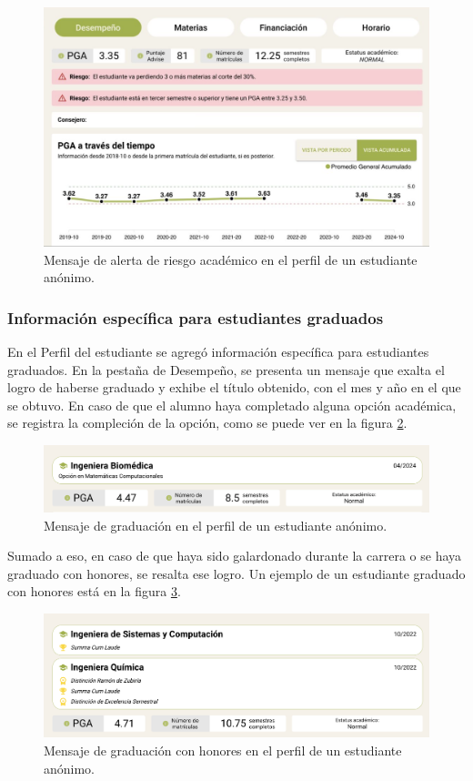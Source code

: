 \begin{figure}[H]
	\includegraphics[width=\textwidth]{assets/nes/riesgo_academico.png}
	\caption{Mensaje de alerta de riesgo académico en el perfil de un estudiante anónimo.}
	\label{fig:riesgo_academico}
\end{figure}

\subsubsection{Información específica para estudiantes graduados}

En el Perfil del estudiante se agregó información específica para estudiantes graduados. En la pestaña de Desempeño, se presenta un mensaje que exalta el logro de haberse graduado y exhibe el título obtenido, con el mes y año en el que se obtuvo. En caso de que el alumno haya completado alguna opción académica, se registra la compleción de la opción, como se puede ver en la figura \ref{fig:graduado}.

\begin{figure}[H]
	\includegraphics[width=\textwidth]{assets/nes/graduado.png}
	\caption{Mensaje de graduación en el perfil de un estudiante anónimo.}
	\label{fig:graduado}
\end{figure}

Sumado a eso, en caso de que haya sido galardonado durante la carrera o se haya graduado con honores, se resalta ese logro. Un ejemplo de un estudiante graduado con honores está en la figura \ref{fig:graduado_honores}.

\begin{figure}[H]
	\includegraphics[width=\textwidth]{assets/nes/graduado_honores.png}
	\caption{Mensaje de graduación con honores en el perfil de un estudiante anónimo.}
	\label{fig:graduado_honores}
\end{figure}
